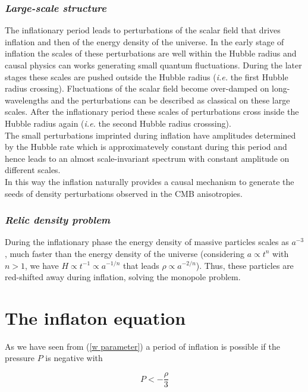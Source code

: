 \documentclass[11pt,a4paper,twoside]{book}
\begin{document}
\subsubsection*{\textit{Large-scale structure}}
The inflationary period leads to perturbations of the scalar field that drives inflation and then of the energy density of the universe. In the early stage of inflation the scales of these perturbations are well within the Hubble radius and causal physics can works generating small quantum fluctuations. During the later stages these scales are pushed outside the Hubble radius (\textit{i.e.} the first Hubble radius crossing). Fluctuations of the scalar field become over-damped on long-wavelengths and the perturbations can be described as classical on these large scales. After the inflationary period these scales of perturbations  cross inside the Hubble radius again (\textit{i.e.} the second Hubble radius crosssing).\\
The small perturbations imprinted during inflation have amplitudes determined by the Hubble rate which is approximatevely constant during this period and hence  leads to an almost scale-invariant spectrum with constant amplitude on different scales.\\
In this way the inflation naturally provides a causal mechanism to generate the seeds of density perturbations observed in the CMB anisotropies.

\subsubsection*{\textit{Relic density problem}}
During the inflationary phase the energy density of massive particles scales as $ a^{-3} $, much faster than the energy density  of the universe (considering $ a \propto t^{n} $ with $ n>1 $, we have $ H \propto t^{-1} \propto a^{-1/n}$ that leads $  \rho \propto a^{-2/n} $). Thus, these particles are red-shifted away during inflation, solving the monopole problem.

\section{The inflaton equation}
As we have seen  from (\ref{w parameter}) a period of inflation is possible if the pressure $ P $ is negative with 

\begin{equation}
\label{Pressure-density}
P < -\frac{\rho}{3}
\end{equation}
\end{document}
